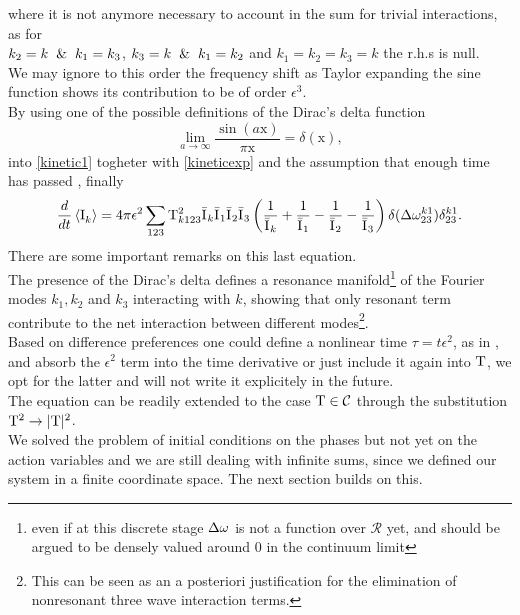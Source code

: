 where it is not anymore necessary to account in the sum for trivial 
interactions, as for \\ $k_2=k \hspace{2mm}\&\hspace{2mm} k_1 = k_3$, $k_3=k \hspace{2mm}\& \hspace{2mm}k_1=k_2$ and $k_1=k_2=k_3=k$ the r.h.s is null.\\
We may ignore to this order the frequency shift as Taylor expanding the sine function shows its contribution to be of order $\epsilon^3$. \\
By using one of the possible definitions of the Dirac's delta function
\begin{equation}
    \underset{a \rightarrow \infty}{\lim} \frac{\sin(a \mathrm{x})}{\pi\mathrm{x}} = \delta(\mathrm{x}),
    \label{delta}
\end{equation}
into \eqref{kinetic1} togheter with \eqref{kineticexp} and the assumption that enough time has passed
, finally
\begin{equation}
    \frac{d}{dt} \left\langle \mathrm{I}^{}_k\right\rangle = 4 \pi\epsilon^2 \sum_{123} \mathrm{T}^2_{k123}\bar{\mathrm{I}^{}}_k\bar{\mathrm{I}^{}}_1\bar{\mathrm{I}^{}}_2\bar{\mathrm{I}^{}}_3
    \left(\frac{1}{\bar{\mathrm{I}^{}}_k} + \frac{1}{\bar{\mathrm{I}^{}}_1} - \frac{1}{\bar{\mathrm{I}^{}}_2}- \frac{1}{\bar{\mathrm{I}^{}}_3}  \right)
    \delta(\Delta{\omega}^{k1}_{23})\delta^{k1}_{23}.
    \label{kinetic2}
\end{equation}
There are some important remarks on this last equation. \\
The presence of the Dirac's delta defines a resonance manifold\footnote{even if at this discrete stage $\Delta{\omega}$ is not a function over $\mathcal{R}$ yet,
 and should be argued to be densely valued around $0$ in the continuum limit} of the Fourier modes $k_1, k_2$ and $k_3$ interacting with $k$, 
 showing that only resonant term contribute to the net interaction between different modes\footnote{
    This can be seen as an a posteriori justification for the elimination of nonresonant three wave interaction terms.
}. \\
Based on difference preferences one could define a nonlinear time $\tau = t \epsilon^2$, as in \cite{Onorato2020}, and absorb the 
$\epsilon^2$ term into the time derivative or just include it again into $\mathrm{T}$, we opt for the latter and will not write it explicitely in the future. \\
The equation can be readily extended to the case $\mathrm{T} \in \mathcal{C}$ through the substitution $\mathrm{T}^2 \rightarrow |\mathrm{T}|^2$.\\
We solved the problem of initial conditions on the phases but not yet on the action variables and we are still dealing with infinite sums, since we defined our system
in a finite coordinate space. The next section builds on this. 

